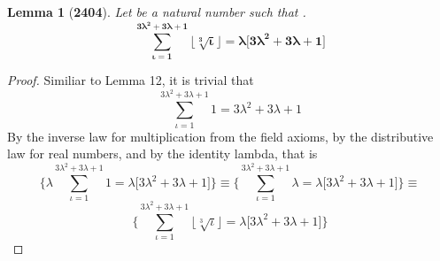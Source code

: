 \documentclass[preview]{standalone}
\newtheorem{lemma}{Lemma}
\begin{document}
\begin{lemma}[\textbf{2404}]
    Let \bm{$\iota$} be a natural number such that
    \bm{$\big \lfloor \sqrt[3] \iota \big \rfloor = \lambda$}.
    \begin{equation*}
        \bm{
            \sum_{\iota=1}^{ 3 \lambda ^2 + 3 \lambda + 1 } 
                    \big \lfloor \sqrt[3] \iota \big \rfloor
                =
            \lambda \big [ 3 \lambda ^2 + 3 \lambda + 1 \big ]
        }
    \end{equation*}
\end{lemma}

\begin{proof}
    Similiar to Lemma 12, it is trivial that
    \begin{equation*}
        \sum_{\iota=1}^{ 3 \lambda ^2 + 3 \lambda + 1 } 
                    1
                =
            3 \lambda ^2 + 3 \lambda + 1
    \end{equation*}
    By the inverse law for multiplication from the field axioms,
    by the distributive law for real numbers, 
    and by the identity lambda, that is
    \begin{equation*}
        \Bigg \{
            \lambda \sum_{\iota=1}^{ 3 \lambda ^2 + 3 \lambda + 1 } 
                        1
                    =
            \lambda \big [ 3 \lambda ^2 + 3 \lambda + 1 \big ]
        \Bigg \}
            \equiv
        \Bigg \{
            \sum_{\iota=1}^{ 3 \lambda ^2 + 3 \lambda + 1 } 
                        \lambda
                    =
            \lambda \big [ 3 \lambda ^2 + 3 \lambda + 1 \big ]
        \Bigg \}
            \equiv
    \end{equation*}
    \begin{equation*}
        \Bigg \{
            \sum_{\iota=1}^{ 3 \lambda ^2 + 3 \lambda + 1 } 
                        \big \lfloor \sqrt[3] \iota \big \rfloor
                    =
            \lambda \big [ 3 \lambda ^2 + 3 \lambda + 1 \big ]
        \Bigg \}
    \end{equation*}
\end{proof}
\end{document}
